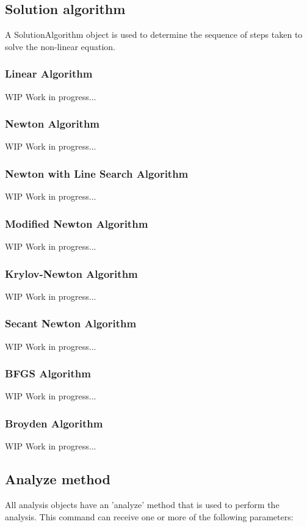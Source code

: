 \subsection{Solution algorithm}
A SolutionAlgorithm object is used to determine the sequence of steps taken to solve the non-linear equation.

\subsubsection{Linear Algorithm}
WIP Work in progress...

\subsubsection{Newton Algorithm}
WIP Work in progress...

\subsubsection{Newton with Line Search Algorithm}
WIP Work in progress...

\subsubsection{Modified Newton Algorithm}
WIP Work in progress...

\subsubsection{Krylov-Newton Algorithm}
WIP Work in progress...

\subsubsection{Secant Newton Algorithm}
WIP Work in progress...

\subsubsection{BFGS Algorithm}
WIP Work in progress...

\subsubsection{Broyden Algorithm}
WIP Work in progress...


\subsection{Analyze method}
All analysis objects have an 'analyze' method that is used to perform the analysis. This command can receive one or more of the following parameters:

